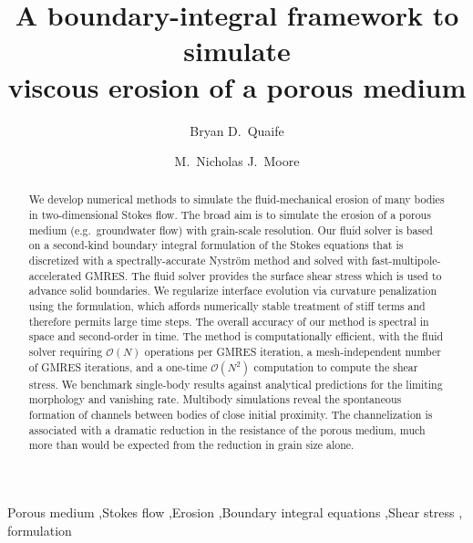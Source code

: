 \documentclass[preprint, 10pt]{elsarticle}
\begin{document}
\title{A boundary-integral framework to simulate \\ viscous erosion of a porous medium}



\author[Bryan]{Bryan D.~Quaife}
\author[Nick]{M.~Nicholas J.~Moore}
\address[Nick]{Department of Mathematics and Geophysical Fluid Dynamics Institute, Florida State University, Tallahassee, FL, 32306.}
\address[Bryan]{Department of Scientific Computing and Geophysical Fluid Dynamics Institute, Florida State University, Tallahassee, FL, 32306.}

\begin{abstract} 
We develop numerical methods to simulate the fluid-mechanical erosion of many bodies in two-dimensional Stokes flow. The broad aim is to simulate the erosion of a porous medium (e.g.~groundwater flow) with grain-scale resolution. Our fluid solver is based on a second-kind boundary integral formulation of the Stokes equations that is discretized with a spectrally-accurate Nystr\"om method and solved with fast-multipole-accelerated GMRES.  The fluid solver provides the surface shear stress which is used to advance solid boundaries. We regularize interface evolution via curvature penalization using the {\thL} formulation, which affords numerically stable treatment of stiff terms and therefore permits large time steps.  The overall accuracy of our method is spectral in space and second-order in time. The method is computationally efficient, with the fluid solver requiring $\mathcal{O}(N)$ operations per GMRES iteration, a mesh-independent number of GMRES iterations, and a one-time $\mathcal{O}(N^2)$ computation to compute the shear stress. We benchmark single-body results against analytical predictions for the limiting morphology and vanishing rate. Multibody simulations reveal the spontaneous formation of channels between bodies of close initial proximity. The channelization is associated with a dramatic reduction in the resistance of the porous medium, much more than would be expected from the reduction in grain size alone.
\end{abstract}

\begin{keyword}
  Porous medium \sep Stokes flow \sep Erosion \sep Boundary integral
  equations \sep Shear stress \sep {\thL} formulation
\end{keyword}
\end{document}

